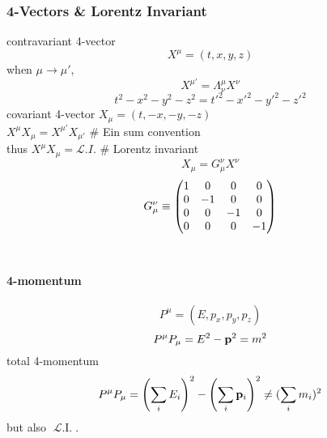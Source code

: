 \documentclass[a4paper]{article}
\DeclareMathOperator{\ra}{\rightarrow}
\DeclareMathOperator{\LI}{\mathscr{L}.I.}
\numberwithin{equation}{section}
\begin{document}
\subsubsection{4-Vectors \& Lorentz Invariant}
contravariant 4-vector
\begin{equation}\label{key}
X^\mu = (t,x,y,z)
\end{equation}
when $ \mu \ra \mu' $, 
\begin{equation}\label{key}
X^{\mu'} = \Lambda^\mu_\nu X^\nu
\end{equation}
\begin{equation}\label{key}
t^2 - x^2 - y^2 - z^2 = t'^2 - x'^2 - y'^2 - z'^2
\end{equation}
covariant 4-vector $ X_\mu = (t,-x,-y,-z) $\\
$ X^\mu X_\mu = X^{\mu'} X_{\mu'} $ \# Ein sum convention\\
thus $ X^\mu X_\mu = \mathscr{L}.I. $ \# Lorentz invariant\\
\begin{equation}\label{key}
X_\mu = G_\mu^\nu X^\nu
\end{equation}
\begin{equation}\label{key}
G_\mu^\nu \equiv \mqty( 1 & 0 & 0 & 0\\
                        0 & -1 & 0 & 0\\
                        0 & 0 & -1 & 0\\
                        0 & 0 & 0 & -1)
\end{equation}
~\\
\paragraph{4-momentum}
\begin{equation}\label{key}
P^\mu = (E, p_x, p_y, p_z)
\end{equation}
\begin{equation}\label{key}
P^\mu P_\mu = E^2 - \vb{p}^2 = m^2
\end{equation}
total 4-momentum
\begin{equation}\label{key}
P^\mu P_\mu = \qty(\sum_i E_i)^2 - \qty(\sum_i \vb{p}_i)^2 \neq (\sum_i m_i)^2
\end{equation}
but also $ \LI $.
\end{document}
